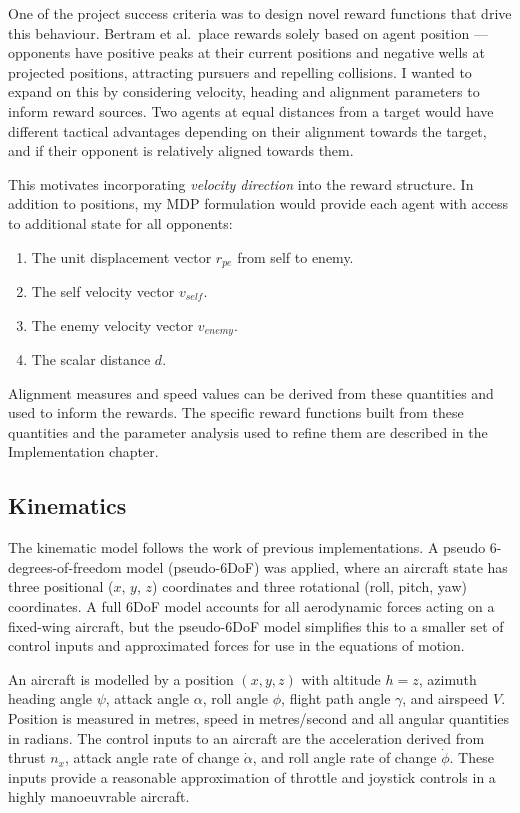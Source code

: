 One of the project success criteria was to design novel reward functions that drive this behaviour. Bertram et al.\ place rewards solely based on agent position --- opponents have positive peaks at their current positions and negative wells at projected positions, attracting pursuers and repelling collisions. I wanted to expand on this by considering velocity, heading and alignment parameters to inform reward sources. Two agents at equal distances from a target would have different tactical advantages depending on their alignment towards the target, and if their opponent is relatively aligned towards them.

This motivates incorporating \textit{velocity direction} into the reward structure. In addition to positions, my MDP formulation would provide each agent with access to additional state for all opponents:
\begin{enumerate}[nosep]
    \item The unit displacement vector $\hat{r}_{pe}$ from self to enemy.
    \item The self velocity vector $v_{self}$.
    \item The enemy velocity vector $v_{enemy}$.
    \item The scalar distance $d$.
\end{enumerate}
  
Alignment measures and speed values can be derived from these quantities and used to inform the rewards. The specific reward functions built from these quantities and the parameter analysis used to refine them are described in the Implementation chapter.

\subsection{Kinematics}
\label{sec:2.3.4}

The kinematic model follows the work of previous implementations\cite{bertram3d,park2016,huynh1987}. A pseudo 6-degrees-of-freedom model (pseudo-6DoF) was applied, where an aircraft state has three positional ($x$, $y$, $z$) coordinates and three rotational (roll, pitch, yaw) coordinates. A full 6DoF model accounts for all aerodynamic forces acting on a fixed-wing aircraft, but the pseudo-6DoF model simplifies this to a smaller set of control inputs and approximated forces for use in the equations of motion.

An aircraft is modelled by a position $(x, y, z)$ with altitude $h = z$, azimuth heading angle $\psi$, attack angle $\alpha$, roll angle $\phi$, flight path angle $\gamma$, and airspeed $V$. Position is measured in metres, speed in metres/second and all angular quantities in radians. The control inputs to an aircraft are the acceleration derived from thrust $n_x$, attack angle rate of change $\dot{\alpha}$, and roll angle rate of change $\dot{\phi}$. These inputs provide a reasonable approximation of throttle and joystick controls in a highly manoeuvrable aircraft.

